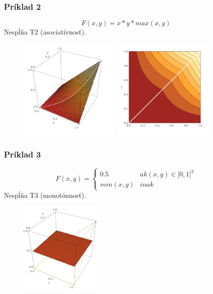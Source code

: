 \documentclass{beamer}
\begin{document}
\begin{frame}
\frametitle{Príklad 2}
$$ F(x,y)=x*y*max(x,y)$$
Nespĺňa T2 (asociatívnosť).
\begin{figure}
\includegraphics[width=5cm]{function3}
\includegraphics[width=5cm]{function32}
\end{figure}
\end{frame}


\begin{frame}
\frametitle{Príklad 3}
\[ F(x,y)=\begin{cases} 
      0.5 & ak (x, y) \in ]0,1[^2 \\
      min(x,y) & inak 
   \end{cases}
\]
Nespĺňa T3 (monotónnosť).
\begin{figure}
\includegraphics[width=4cm]{F3}
\end{figure}
\end{frame}
\end{document}
